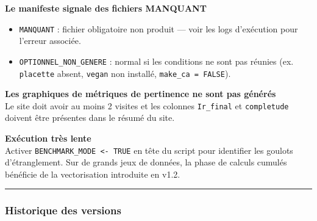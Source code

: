 \textbf{Le manifeste signale des fichiers MANQUANT}

\begin{itemize}
\tightlist
\item
  \texttt{MANQUANT} : fichier obligatoire non produit --- voir les logs
  d'exécution pour l'erreur associée.
\item
  \texttt{OPTIONNEL\_NON\_GENERE} : normal si les conditions ne sont pas
  réunies (ex. \texttt{placette} absent, \texttt{vegan} non installé,
  \texttt{make\_ca\ =\ FALSE}).
\end{itemize}

\textbf{Les graphiques de métriques de pertinence ne sont pas générés}\\
Le site doit avoir au moins 2 visites et les colonnes \texttt{Ir\_final}
et \texttt{completude} doivent être présentes dans le résumé du site.

\textbf{Exécution très lente}\\
Activer \texttt{BENCHMARK\_MODE\ \textless{}-\ TRUE} en tête du script
pour identifier les goulots d'étranglement. Sur de grands jeux de
données, la phase de calculs cumulés bénéficie de la vectorisation
introduite en v1.2.

\begin{center}\rule{0.5\linewidth}{0.5pt}\end{center}

\subsubsection{Historique des versions}\label{historique-des-versions}

